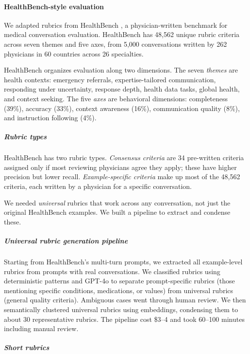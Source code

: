 
\paragraph{HealthBench-style evaluation}

We adapted rubrics from HealthBench \cite{healthbench}, a physician-written benchmark for medical conversation evaluation. HealthBench has 48,562 unique rubric criteria across seven themes and five axes, from 5,000 conversations written by 262 physicians in 60 countries across 26 specialties.

HealthBench organizes evaluation along two dimensions. The seven \textit{themes} are health contexts: emergency referrals, expertise-tailored communication, responding under uncertainty, response depth, health data tasks, global health, and context seeking. The five \textit{axes} are behavioral dimensions: completeness (39\%), accuracy (33\%), context awareness (16\%), communication quality (8\%), and instruction following (4\%).

\subparagraph{Rubric types}

HealthBench has two rubric types. \textit{Consensus criteria} are 34 pre-written criteria assigned only if most reviewing physicians agree they apply; these have higher precision but lower recall. \textit{Example-specific criteria} make up most of the 48,562 criteria, each written by a physician for a specific conversation.

We needed \textit{universal} rubrics that work across any conversation, not just the original HealthBench examples. We built a pipeline to extract and condense these.

\subparagraph{Universal rubric generation pipeline}

Starting from HealthBench's multi-turn prompts, we extracted all example-level rubrics from prompts with real conversations. We classified rubrics using deterministic patterns and GPT-4o to separate prompt-specific rubrics (those mentioning specific conditions, medications, or values) from universal rubrics (general quality criteria). Ambiguous cases went through human review. We then semantically clustered universal rubrics using embeddings, condensing them to about 30 representative rubrics. The pipeline cost \$3--4 and took 60--100 minutes including manual review.

\subparagraph{Short rubrics}

